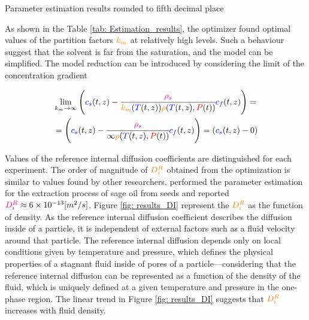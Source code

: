 \documentclass[../Article_Model_Parameters.tex]{subfiles}
\begin{document}
	
	\begin{table}[!h]
		\centering
		\caption{Parameter estimation results rounded to fifth decimal place}
		\label{tab: Estimation_results}
	\end{table}
	
	As shown in the Table \ref{tab: Estimation_results}, the optimizer found optimal values of the partition factors ${\color{orange}k_m}$ at relatively high levels. Such a behaviour suggest that the solvent is far from the saturation, and the model can be simplified. The model reduction can be introduced by considering the limit of the concentration gradient
	
	{\footnotesize
	\begin{equation*}
		\begin{split}
			&\lim_{k_m \rightarrow \infty} \left({\color{blue}{\color{blue} c_s} }(t,z)  - \cfrac{{\color{magenta}\rho_s}}{{\color{orange}k_m}({\color{blue}T}(t,z)){\color{orange}\rho}({\color{blue}T}(t,z),{\color{red}P}(t))}  {\color{blue}c_f}(t,z) \right)  = \\
			&= \left({\color{blue}{\color{blue} c_s} }(t,z)  - \cfrac{{\color{magenta}\rho_s}}{\infty{\color{orange}\rho}({\color{blue}T}(t,z),{\color{red}P}(t))}  {\color{blue}c_f}(t,z) \right) = \left({\color{blue}{\color{blue} c_s} }(t,z) - 0 \right)
		\end{split}
	\end{equation*} }
		
	Values of the reference internal diffusion coefficients are distinguished for each experiment. The order of magnitude of ${\color{orange}D_i^R}$ obtained from the optimization is similar to values found by other researchers. \citet{Reverchon1996} performed the parameter estimation for the extraction process of sage oil from seeds and reported ${\color{magenta}D_i^R} \approx 6\times 10^{-13}[m^2/s]$. Figure \ref{fig: results_DI} represent the ${\color{orange}D_i^R}$ as the function of density. As the reference internal diffusion coefficient describes the diffusion inside of a particle, it is independent of external factors such as a fluid velocity around that particle. The reference internal diffusion depends only on local conditions given by temperature and pressure, which defines the physical properties of a stagnant fluid inside of pores of a particle—considering that the reference internal diffusion can be represented as a function of the density of the fluid, which is uniquely defined at a given temperature and pressure in the one-phase region. The linear trend in Figure \ref{fig: results_DI} suggests that ${\color{orange}D_i^R}$ increases with fluid density.
	
\end{document}
